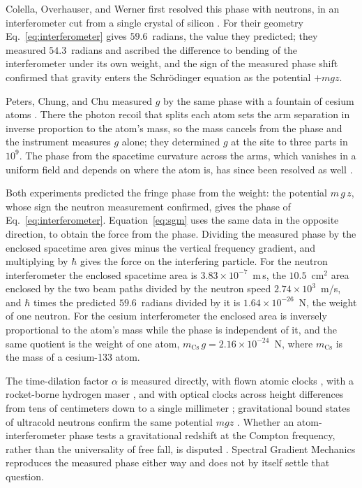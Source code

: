 \documentclass[aps,prd,onecolumn,tightenlines,nofootinbib,notitlepage,11pt,floatfix]{revtex4-2}
\theoremstyle{indentedtheorem}
\begin{document}
Colella, Overhauser, and Werner first resolved this phase with neutrons, in an interferometer cut from a single crystal of silicon \citep{Colella1975Observation}. For their geometry Eq.~\eqref{eq:interferometer} gives $59.6$~radians, the value they predicted; they measured $54.3$~radians and ascribed the difference to bending of the interferometer under its own weight, and the sign of the measured phase shift confirmed that gravity enters the Schr\"odinger equation as the potential $+mgz$.

Peters, Chung, and Chu measured $g$ by the same phase with a fountain of cesium atoms \citep{Peters1999Measurement}. There the photon recoil that splits each atom sets the arm separation in inverse proportion to the atom's mass, so the mass cancels from the phase and the instrument measures $g$ alone; they determined $g$ at the site to three parts in $10^{9}$. The phase from the spacetime curvature across the arms, which vanishes in a uniform field and depends on where the atom is, has since been resolved as well \citep{Asenbaum2017Phase}.

Both experiments predicted the fringe phase from the weight: the potential $m \, g \, z$, whose sign the neutron measurement confirmed, gives the phase of Eq.~\eqref{eq:interferometer}. Equation~\eqref{eq:sgm} uses the same data in the opposite direction, to obtain the force from the phase. Dividing the measured phase by the enclosed spacetime area gives minus the vertical frequency gradient, and multiplying by $\hbar$ gives the force on the interfering particle. For the neutron interferometer the enclosed spacetime area is $3.83\times10^{-7}$~m\,s, the $10.5$~cm$^2$ area enclosed by the two beam paths divided by the neutron speed $2.74\times10^{3}$~m/s, and $\hbar$ times the predicted $59.6$~radians divided by it is $1.64\times10^{-26}$~N, the weight of one neutron. For the cesium interferometer the enclosed area is inversely proportional to the atom's mass while the phase is independent of it, and the same quotient is the weight of one atom, $m_\text{Cs}\,g=2.16\times10^{-24}$~N, where $m_\text{Cs}$ is the mass of a cesium-133 atom.

The time-dilation factor $\alpha$ is measured directly, with flown atomic clocks \citep{Hafele1972Clocks,Hafele1972Observed}, with a rocket-borne hydrogen maser \citep{Vessot1980Test}, and with optical clocks across height differences from tens of centimeters \citep{Chou2010Optical} down to a single millimeter \citep{Bothwell2022Resolving}; gravitational bound states of ultracold neutrons confirm the same potential $mgz$ \citep{Nesvizhevsky2002Quantum}. Whether an atom-interferometer phase tests a gravitational redshift at the Compton frequency, rather than the universality of free fall, is disputed \citep{Mueller2010Precision,Wolf2011,SinhaSamuel2011,Hohensee2012Comment,Wolf2012Reply,Schleich2013Representation,Roura2020Gravitational}. Spectral Gradient Mechanics reproduces the measured phase either way and does not by itself settle that question.
\end{document}
